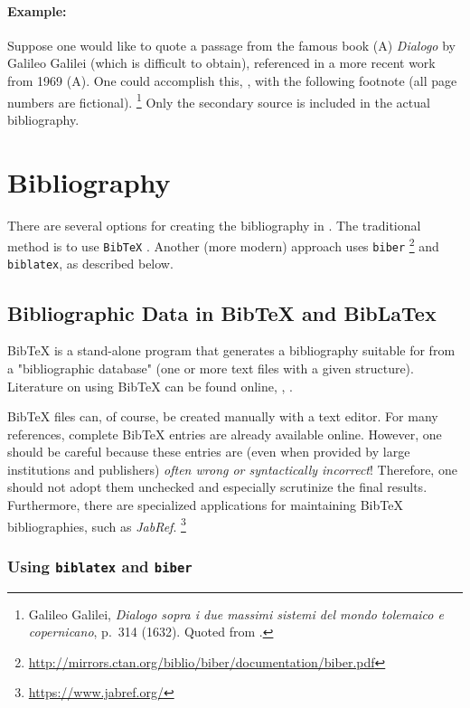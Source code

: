 \paragraph{Example:} Suppose one would like to quote a passage from the famous
book (\textrm{A}) \emph{Dialogo} by Galileo Galilei (which is difficult to obtain),
referenced in a more recent work from 1969 (\textrm{A}). One could accomplish this,
\eg, with the following footnote (all page numbers are fictional).%
\footnote{Galileo Galilei, \emph{Dialogo sopra i due massimi sistemi del
mondo tolemaico e copernicano}, p.~314 (1632). Quoted from 
\cite[p.~59]{Hemleben1969}.}
Only the secondary source \cite{Hemleben1969} is included in the actual bibliography.


\section{Bibliography}

There are several options for creating the bibliography in \latex. The
traditional method is to use \texttt{BibTeX} \cite{Patashnik1988}. Another (more
modern) approach uses \texttt{biber}%
\footnote{\url{http://mirrors.ctan.org/biblio/biber/documentation/biber.pdf}}
and \texttt{biblatex}, as described below.


\subsection{Bibliographic Data in BibTeX and BibLaTex}
\label{sec:bibtex}

BibTeX is a stand-alone program that generates a bibliography suitable for
\latex from a "bibliographic database" (one or more text files with a given
structure). Literature on using BibTeX can be found online, \eg,
\cite{Feder2006, Patashnik1988}.

BibTeX files can, of course, be created manually with a text editor. For many
references, complete BibTeX entries are already available online. However, one
should be careful because these entries are (even when provided by large
institutions and publishers) \emph{often wrong or syntactically incorrect}!
Therefore, one should not adopt them unchecked and especially scrutinize the
final results. Furthermore, there are specialized applications for maintaining
BibTeX bibliographies, such as \emph{JabRef}.%
\footnote{\url{https://www.jabref.org/}}

\subsubsection{Using \texttt{biblatex} and \texttt{biber}}

